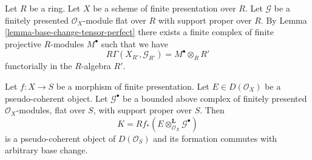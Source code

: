 \begin{remark}
\label{remark-explain-perfect-direct-image}
Let $R$ be a ring. Let $X$ be a scheme of finite presentation over
$R$. Let $\mathcal{G}$ be a finitely presented $\mathcal{O}_X$-module
flat over $R$ with support proper over $R$. By
Lemma \ref{lemma-base-change-tensor-perfect}
there exists a finite complex of finite projective $R$-modules
$M^\bullet$ such that we have
$$
R\Gamma(X_{R'}, \mathcal{G}_{R'}) = M^\bullet \otimes_R R'
$$
functorially in the $R$-algebra $R'$.
\end{remark}

\begin{lemma}
\label{lemma-base-change-tensor-pseudo-coherent}
Let $f : X \to S$ be a morphism of finite presentation.
Let $E \in D(\mathcal{O}_X)$ be a pseudo-coherent object.
Let $\mathcal{G}^\bullet$ be a bounded above complex of
finitely presented $\mathcal{O}_X$-modules, flat over $S$,
with support proper over $S$. Then
$$
K = Rf_*(E \otimes_{\mathcal{O}_X}^\mathbf{L} \mathcal{G}^\bullet)
$$
is a pseudo-coherent object of $D(\mathcal{O}_S)$ and its formation
commutes with arbitrary base change.
\end{lemma}

